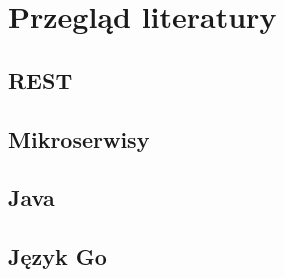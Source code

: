 \chapter{Przegląd literatury}

\section{REST}


\section{Mikroserwisy}


\section{Java}


\section{Język Go}


% 